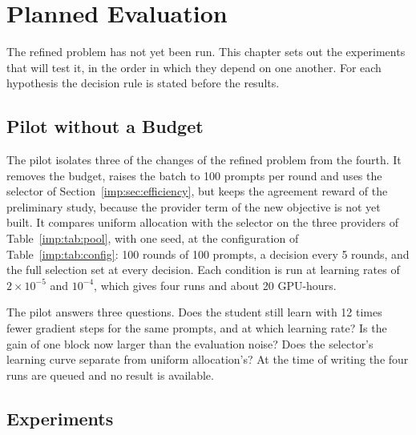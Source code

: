 \chapter{Planned Evaluation}
\label{chap:Plan}

The refined problem has not yet been run. This chapter sets out the experiments that
will test it, in the order in which they depend on one another. For each hypothesis the
decision rule is stated before the results.

\section{Pilot without a Budget}
\label{plan:sec:pilot}

The pilot isolates three of the changes of the refined problem from the fourth. It
removes the budget, raises the batch to 100 prompts per round and uses the selector of
Section~\ref{imp:sec:efficiency}, but keeps the agreement reward of the preliminary
study, because the provider term of the new objective is not yet built. It compares
uniform allocation with the selector on the three providers of
Table~\ref{imp:tab:pool}, with one seed, at the configuration of
Table~\ref{imp:tab:config}: 100 rounds of 100 prompts, a decision every 5 rounds, and
the full selection set at every decision. Each condition is run at learning rates of
$2 \times 10^{-5}$ and $10^{-4}$, which gives four runs and about 20 GPU-hours.

The pilot answers three questions. Does the student still learn with 12 times fewer
gradient steps for the same prompts, and at which learning rate? Is the gain of one
block now larger than the evaluation noise? Does the selector's learning curve separate
from uniform allocation's? At the time of writing the four runs are queued and no result
is available.

\section{Experiments}
\label{plan:sec:experiments}


